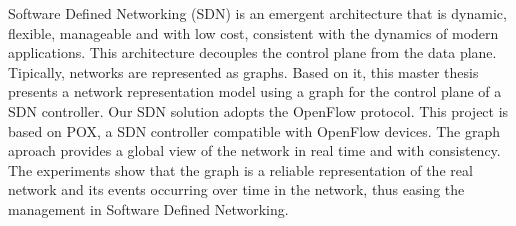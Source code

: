 
Software Defined Networking (SDN) is an emergent architecture
that is dynamic, flexible, manageable and with low cost, 
consistent with the dynamics of modern applications.
This architecture decouples the control plane from the data plane.
Tipically, networks are represented as graphs.
Based on it, this master thesis presents a network 
representation model using a graph for the control plane 
of a SDN controller.
Our SDN solution adopts the OpenFlow protocol.
This project is based on POX, a SDN controller compatible 
with OpenFlow devices.
The graph aproach provides a global view of the network in real 
time and with consistency.
The experiments show that the graph is a reliable representation of 
the real network and its events occurring over time in the network,
thus easing the management in Software Defined Networking.

